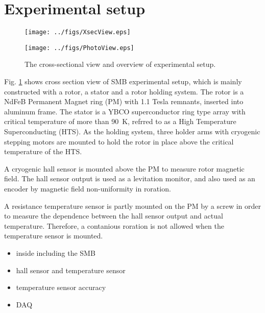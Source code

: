 \section{Experimental setup}

\begin{figure}[htb]
  \begin{minipage}{0.49\hsize}
    \centering
    \texttt{[image: ../figs/XsecView.eps]}%
  \end{minipage}
  \begin{minipage}{0.49\hsize}
    \centering
    \texttt{[image: ../figs/PhotoView.eps]}%
  \end{minipage}
  \caption{The cross-sectional view and overview of experimental setup.}
  \label{fig:ExpSetup}
\end{figure}

Fig. \ref{fig:ExpSetup} shows cross section view of SMB experimental setup,
which is mainly constructed with a rotor, a stator and a rotor holding system.
The rotor is a NdFeB Permanent Magnet ring (PM) with 1.1 Tesla remnants, inserted into aluminum frame.
The stator is a YBCO superconductor ring type array with critical temperature of more than 90~K,
refrred to as a High Temperature Superconducting (HTS).
As the holding system, three holder arms with cryogenic stepping motors are mounted
to hold the rotor in place above the critical temperature of the HTS.

A cryogenic hall sensor is mounted above the PM to measure rotor magnetic field.
The hall sensor output is used as a levitation monitor, and also used as an encoder by magnetic field non-uniformity in roration.

A resistance temperature sensor is partly mounted on the PM by a screw
in order to measure the dependence between the hall sensor output and actual temperature.
Therefore, a contanious roration is not allowed when the temperature sensor is mounted.


\begin{itemize}
\item inside including the SMB
\item hall sensor and temperature sensor
\item temperature sensor accuracy
\item DAQ
\end{itemize}
